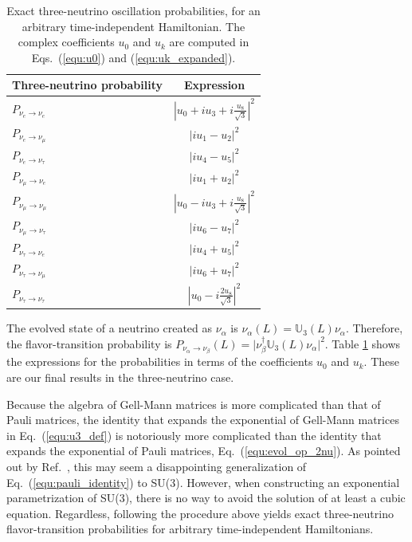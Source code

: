 \documentclass[final,5p,times,twocolumn]{elsarticle}
\newcommand{\eq}{Eq.}
\newcommand{\Ref}{Ref.}
\newcommand{\equ}[1]{\eq~(\ref{equ:#1})}
\begin{document}
{\def\arraystretch{1.3}
\begin{table}[t!]
  \begin{tabular}{lc}
   Three-neutrino probability & Expression \\
   \hline 
   $P_{\nu_e \to \nu_e}$        & $\left\vert u_0 + i u_3 + i \frac{u_8}{\sqrt{3}} \right\vert^2$ \\
   $P_{\nu_e \to \nu_\mu}$      & $\left\vert i u_1 - u_2 \right\vert^2$ \\
   $P_{\nu_e \to \nu_\tau}$     & $\left\vert i u_4 - u_5 \right\vert^2$ \\
   $P_{\nu_\mu \to \nu_e}$      & $\left\vert i u_1 + u_2 \right\vert^2$ \\
   $P_{\nu_\mu \to \nu_\mu}$    & $\left\vert u_0 - i u_3 + i \frac{u_8}{\sqrt{3}} \right\vert^2$ \\
   $P_{\nu_\mu \to \nu_\tau}$   & $\left\vert i u_6 - u_7 \right\vert^2$ \\
   $P_{\nu_\tau \to \nu_e}$     & $\left\vert i u_4 + u_5 \right\vert^2$ \\
   $P_{\nu_\tau \to \nu_\mu}$   & $\left\vert i u_6 + u_7 \right\vert^2$ \\
   $P_{\nu_\tau \to \nu_\tau}$  & $\left\vert u_0 - i \frac{2 u_8}{\sqrt{3}} \right\vert^2$ \\
  \end{tabular}
  \caption{\label{tab:prob_3nu}Exact three-neutrino oscillation probabilities, for an arbitrary time-independent Hamiltonian.  The complex coefficients $u_0$ and $u_k$ are computed in Eqs.\ (\ref{equ:u0}) and (\ref{equ:uk_expanded}).}
\end{table}
}

The evolved state of a neutrino created as $\nu_\alpha$ is $\nu_\alpha(L) = \mathbb{U}_3(L) \nu_\alpha$.  Therefore, the flavor-transition probability is $P_{\nu_\alpha \to \nu_\beta}(L) = \lvert \nu_\beta^\dagger \mathbb{U}_3(L) \nu_\alpha \rvert^2$.   Table \ref{tab:prob_3nu} shows the expressions for the probabilities in terms of the coefficients $u_0$ and $u_k$.  These are our final results in the three-neutrino case.  

Because the algebra of Gell-Mann matrices is more complicated than that of Pauli matrices, the identity that expands the exponential of Gell-Mann matrices in \equ{u3_def} is notoriously more complicated than the identity that expands the exponential of Pauli matrices, \equ{evol_op_2nu}.  As pointed out by \Ref\ \cite{MacFarlane:1968vc}, this may seem a disappointing generalization of \equ{pauli_identity} to SU(3).  However, when constructing an exponential parametrization of SU(3), there is no way to avoid the solution of at least a cubic equation.  Regardless, following the procedure above yields exact three-neutrino flavor-transition probabilities for arbitrary time-independent Hamiltonians.
\end{document}
